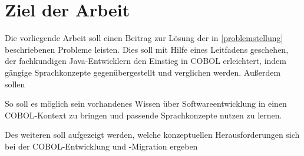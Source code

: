 \chapter{Ziel der Arbeit}

Die vorliegende Arbeit soll einen Beitrag zur Lösung der in \autoref{problemstellung} beschriebenen Probleme leisten. Dies soll mit Hilfe eines Leitfadens geschehen, der fachkundigen Java-Entwicklern den Einstieg in COBOL erleichtert, indem gängige Sprachkonzepte gegenübergestellt und verglichen werden. Außerdem sollen 

So soll es möglich sein vorhandenes Wissen über Softwareentwicklung in einen COBOL-Kontext zu bringen und passende Sprachkonzepte nutzen zu lernen. 

Des weiteren soll aufgezeigt werden, welche konzeptuellen Herausforderungen sich bei der COBOL-Entwicklung und -Migration ergeben
